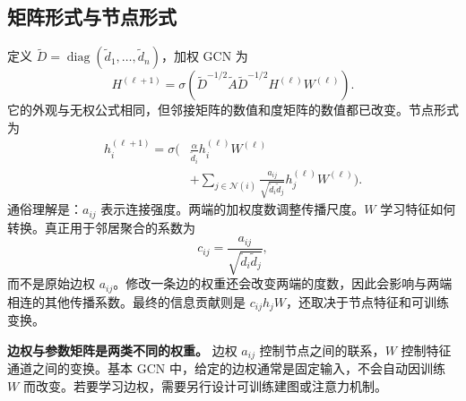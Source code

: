 \documentclass[UTF8,a4paper,11pt,fontset=fandol]{ctexart}
\begin{document}
\subsection{矩阵形式与节点形式}
定义 $\widetilde D=\operatorname{diag}(\widetilde d_1,\ldots,\widetilde d_n)$，加权 GCN 为
\begin{equation}
\boxed{
H^{(\ell+1)}=\sigma\!\left(
\widetilde D^{-1/2}\widetilde A\widetilde D^{-1/2}
H^{(\ell)}W^{(\ell)}\right).
}
\label{eq:weighted-gcn}
\end{equation}
它的外观与无权公式相同，但邻接矩阵的数值和度矩阵的数值都已改变。节点形式为
\begin{equation}
\begin{split}
h_i^{(\ell+1)}=\sigma\!\Bigg(&
\frac{\alpha}{\widetilde d_i}h_i^{(\ell)}W^{(\ell)}\\
&+\sum_{j\in\mathcal N(i)}
\frac{a_{ij}}{\sqrt{\widetilde d_i\widetilde d_j}}
 h_j^{(\ell)}W^{(\ell)}\Bigg).
\end{split}
\label{eq:weighted-node}
\end{equation}
通俗理解是：$a_{ij}$ 表示连接强度。两端的加权度数调整传播尺度。$W$ 学习特征如何转换。真正用于邻居聚合的系数为
\begin{equation}
c_{ij}=\frac{a_{ij}}{\sqrt{\widetilde d_i\widetilde d_j}},
\end{equation}
而不是原始边权 $a_{ij}$。修改一条边的权重还会改变两端的度数，因此会影响与两端相连的其他传播系数。最终的信息贡献则是 $c_{ij}h_jW$，还取决于节点特征和可训练变换。

\textbf{边权与参数矩阵是两类不同的权重。} 边权 $a_{ij}$ 控制节点之间的联系，$W$ 控制特征通道之间的变换。基本 GCN 中，给定的边权通常是固定输入，不会自动因训练 $W$ 而改变。若要学习边权，需要另行设计可训练建图或注意力机制。
\end{document}
